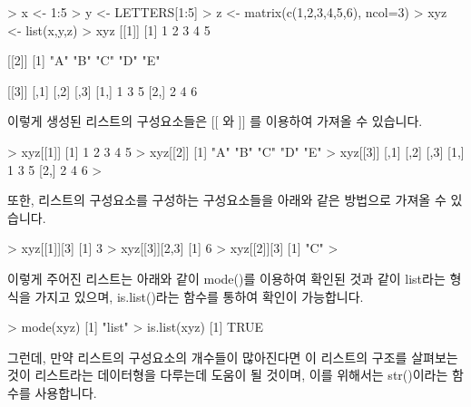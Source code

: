 \begin{Schunk}
\begin{Soutput}
> x <- 1:5
> y <- LETTERS[1:5]
> z <- matrix(c(1,2,3,4,5,6), ncol=3)
> xyz <- list(x,y,z)
> xyz
[[1]]
[1] 1 2 3 4 5

[[2]]
[1] "A" "B" "C" "D" "E"

[[3]]
     [,1] [,2] [,3]
[1,]    1    3    5
[2,]    2    4    6
 
\end{Soutput}
\end{Schunk}

이렇게 생성된 리스트의 구성요소들은 $[[$ 와 $]]$ 를 이용하여 가져올 수 있습니다.

\begin{Schunk}
\begin{Soutput}
> xyz[[1]]
[1] 1 2 3 4 5
> xyz[[2]]
[1] "A" "B" "C" "D" "E"
> xyz[[3]]
     [,1] [,2] [,3]
[1,]    1    3    5
[2,]    2    4    6
> 
\end{Soutput}
\end{Schunk}

또한, 리스트의 구성요소를 구성하는 구성요소들을 아래와 같은 방법으로 가져올 수 있습니다.
\begin{Schunk}
\begin{Soutput}
> xyz[[1]][3]
[1] 3
> xyz[[3]][2,3]
[1] 6
> xyz[[2]][3]
[1] "C"
> 
\end{Soutput}
\end{Schunk}

이렇게 주어진 리스트는 아래와 같이 mode()를 이용하여 확인된 것과 같이 list라는 형식을 가지고 있으며, is.list()라는 함수를 통하여 확인이 가능합니다.

\begin{Schunk}
\begin{Soutput}
> mode(xyz)
[1] "list"
> is.list(xyz)
[1] TRUE
\end{Soutput}
\end{Schunk}

그런데, 만약 리스트의 구성요소의 개수들이 많아진다면 이 리스트의 구조를 살펴보는 것이 리스트라는 데이터형을 다루는데 도움이 될 것이며, 이를 위해서는 str()이라는 함수를 사용합니다.

\begin{Schunk}
\end{Schunk}

